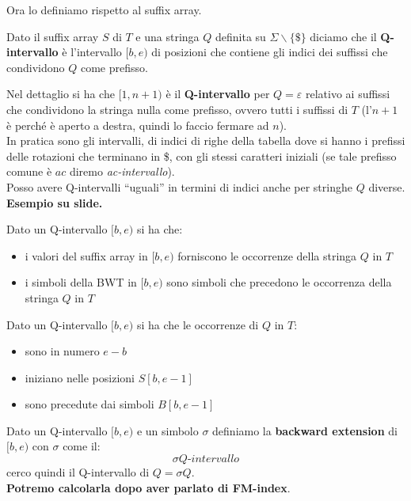 \documentclass[a4paper,12pt, oneside]{book}
\begin{document}
Ora lo definiamo rispetto al suffix array.
\begin{definizione}
  Dato il suffix array $S$ di $T$ e una stringa $Q$ definita su
  $\Sigma\backslash\{\$\}$ diciamo che il \textbf{Q-intervallo} è l'intervallo
  $[b,e)$ di posizioni che contiene gli indici dei suffissi che condividono $Q$
  come prefisso.
\end{definizione}
Nel dettaglio si ha che $[1,n+1)$ è il \textbf{Q-intervallo} per $Q=\varepsilon$
relativo ai suffissi che condividono la stringa nulla come prefisso, ovvero
tutti i suffissi di $T$ (l'$n+1$ è perché è aperto a destra, quindi lo faccio
fermare ad $n$).\\
In pratica sono gli intervalli, di indici di righe della tabella dove si hanno
i prefissi delle rotazioni che terminano in \$, con gli stessi caratteri
iniziali (se tale prefisso comune è $ac$ diremo \textit{ac-intervallo}). \\
Posso avere Q-intervalli ``uguali'' in termini di indici anche per stringhe $Q$
diverse.\\
\textbf{Esempio su slide.}
\begin{definizione}
  Dato un Q-intervallo $[b,e)$ si ha che:
  \begin{itemize}
    \item i valori del suffix array in $[b,e)$ forniscono le occorrenze della
    stringa $Q$ in $T$
    \item i simboli della BWT in $[b,e)$ sono simboli che precedono le occorrenza
    della stringa $Q$ in $T$
  \end{itemize}
\end{definizione}
\begin{definizione}
  Dato un Q-intervallo $[b,e)$ si ha che le occorrenze di $Q$ in $T$:
  \begin{itemize}
    \item sono in numero $e-b$
    \item iniziano nelle posizioni $S[b,e-1]$
    \item sono precedute dai simboli $B[b,e-1]$
  \end{itemize}
\end{definizione}
\begin{definizione}
 Dato un Q-intervallo $[b,e)$ e un simbolo $\sigma$ definiamo la
 \textbf{backward extension} di $[b,e)$ con $\sigma$ come il:
 \[\sigma Q\mbox{-}intervallo\]
 cerco quindi il Q-intervallo di $Q=\sigma Q$.\\
 \textbf{Potremo calcolarla dopo aver parlato di FM-index}.
\end{definizione}
\end{document}
